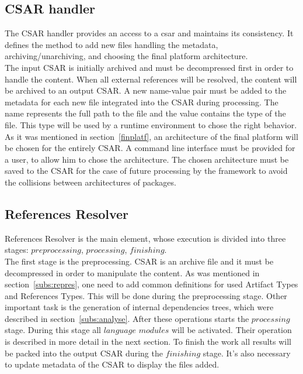 \subsection{CSAR handler} \label{subs:casr_h}
The CSAR handler provides an access to a \gls{csar} and maintains its consistency. 
It defines the method to add new files handling the metadata, \mbox{archiving/unarchiving}, and choosing the final platform architecture. \\
The input CSAR is initially archived and must be decompressed first in order to handle the content.
When all external references will be resolved, the content will be archived to an output CSAR.
A new name-value pair must be added to the metadata for each new file integrated into the CSAR during processing. 
The name represents the full path to the file and the value contains the type of the file. 
This type will be used by a runtime environment to chose the right behavior. %
As it was mentioned in section~\ref{finplatf}, an architecture of the final platform will be chosen for the entirely CSAR.
A command line interface must be provided for a user, to allow him to chose the architecture. 
The chosen architecture must be saved to the CSAR for the case of future processing by the framework to avoid the collisions between architectures of packages.

\subsection{References Resolver} \label{subs:RR}
References Resolver is the main element, whose execution is divided into three stages: $preprocessing$, $processing$, $finishing$. \\
The first stage is the preprocessing.
CSAR is an archive file and it must be decompressed in order to manipulate the content. 
As was mentioned in section~\ref{subs:repres}, one need to add common definitions for used Artifact Types and References Types.
This will be done during the preprocessing stage.
Other important task is the generation of internal dependencies trees, which were described in section~\ref{subs:analyse}.
After these operations starts the $processing$ stage.
During this stage all $language$ $modules$ will be activated.
Their operation is described in more detail in the next section. %
To finish the work all results will be packed into the output CSAR during the $finishing$ stage.
It's also necessary to update metadata of the CSAR to display the files added.
%

